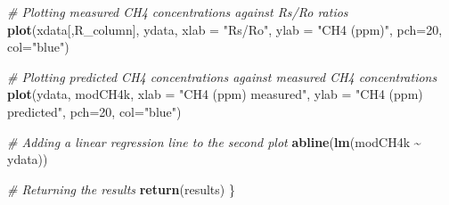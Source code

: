 \documentclass[
]{article}
\newenvironment{Shaded}{\begin{snugshade}}{\end{snugshade}}
\newcommand{\AttributeTok}[1]{\textcolor[rgb]{0.13,0.29,0.53}{#1}}
\newcommand{\CommentTok}[1]{\textcolor[rgb]{0.56,0.35,0.01}{\textit{#1}}}
\newcommand{\DecValTok}[1]{\textcolor[rgb]{0.00,0.00,0.81}{#1}}
\newcommand{\FunctionTok}[1]{\textcolor[rgb]{0.13,0.29,0.53}{\textbf{#1}}}
\newcommand{\NormalTok}[1]{#1}
\newcommand{\SpecialCharTok}[1]{\textcolor[rgb]{0.81,0.36,0.00}{\textbf{#1}}}
\newcommand{\StringTok}[1]{\textcolor[rgb]{0.31,0.60,0.02}{#1}}
\begin{document}
\begin{Shaded}
\begin{Highlighting}[]
  \CommentTok{\# Plotting measured CH4 concentrations against Rs/Ro ratios}
  \FunctionTok{plot}\NormalTok{(xdata[,R\_column], }
\NormalTok{       ydata, }\AttributeTok{xlab =} \StringTok{"Rs/Ro"}\NormalTok{, }\AttributeTok{ylab =} \StringTok{"CH4 (ppm)"}\NormalTok{, }\AttributeTok{pch=}\DecValTok{20}\NormalTok{, }\AttributeTok{col=}\StringTok{"blue"}\NormalTok{)}
  
  \CommentTok{\# Plotting predicted CH4 concentrations against measured CH4 concentrations}
  \FunctionTok{plot}\NormalTok{(ydata, modCH4k, }
       \AttributeTok{xlab =} \StringTok{"CH4 (ppm) measured"}\NormalTok{, }\AttributeTok{ylab =} \StringTok{"CH4 (ppm) predicted"}\NormalTok{, }\AttributeTok{pch=}\DecValTok{20}\NormalTok{, }\AttributeTok{col=}\StringTok{"blue"}\NormalTok{)}
  
  \CommentTok{\# Adding a linear regression line to the second plot}
  \FunctionTok{abline}\NormalTok{(}\FunctionTok{lm}\NormalTok{(modCH4k }\SpecialCharTok{\textasciitilde{}}\NormalTok{ ydata))}
  
  \CommentTok{\# Returning the results}
  \FunctionTok{return}\NormalTok{(results)}
\NormalTok{\}}
\end{Highlighting}
\end{Shaded}
\end{document}
